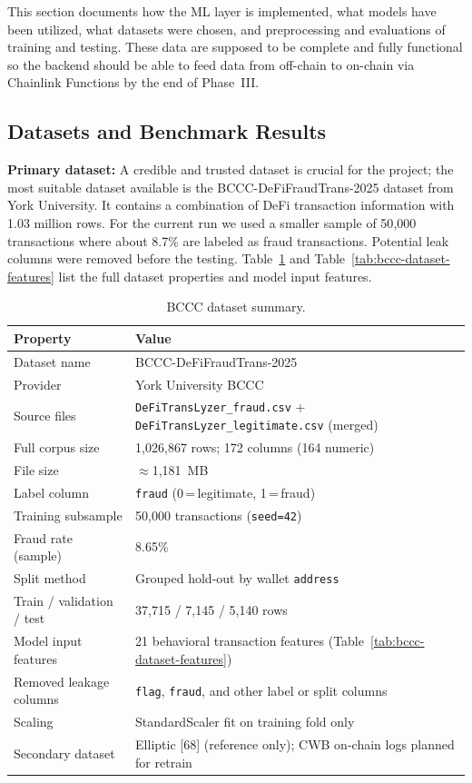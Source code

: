This section documents how the ML layer is implemented, what models have been utilized, what datasets were chosen, and preprocessing and evaluations of training and testing. These data are supposed to be complete and fully functional so the backend should be able to feed data from off-chain to on-chain via Chainlink Functions by the end of Phase~III.

\subsection{Datasets and Benchmark Results}
\label{sec:ml-workload}
\label{sec:ml-explainability}
\label{sec:ml-evaluation}

\textbf{Primary dataset:} A credible and trusted dataset is crucial for the project; the most suitable dataset available is the BCCC-DeFiFraudTrans-2025 dataset from York University. It contains a combination of DeFi transaction information with 1.03 million rows. For the current run we used a smaller sample of 50{,}000 transactions where about 8.7\% are labeled as fraud transactions. Potential leak columns were removed before the testing. Table~\ref{tab:bccc-dataset-summary} and Table~\ref{tab:bccc-dataset-features} list the full dataset properties and model input features.

\begin{table}[H]
\centering
\caption[BCCC dataset summary]{BCCC dataset summary.}
\label{tab:bccc-dataset-summary}
\small
\begin{tabular}{@{}p{3.6cm}p{10.2cm}@{}}
\toprule
\tableheadcolor
\textbf{Property} & \textbf{Value} \\
\midrule
Dataset name & BCCC-DeFiFraudTrans-2025 \\
Provider & York University BCCC \\
Source files & \texttt{DeFiTransLyzer\_fraud.csv} + \texttt{DeFiTransLyzer\_legitimate.csv} (merged) \\
Full corpus size & 1{,}026{,}867 rows; 172 columns (164 numeric) \\
File size & ${\approx}$1{,}181~MB \\
Label column & \texttt{fraud} (0\,=\,legitimate, 1\,=\,fraud) \\
Training subsample & 50{,}000 transactions (\texttt{seed=42}) \\
Fraud rate (sample) & 8.65\% \\
Split method & Grouped hold-out by wallet \texttt{address} \\
Train / validation / test & 37{,}715 / 7{,}145 / 5{,}140 rows \\
Model input features & 21 behavioral transaction features (Table~\ref{tab:bccc-dataset-features}) \\
Removed leakage columns & \texttt{flag}, \texttt{fraud}, and other label or split columns \\
Scaling & StandardScaler fit on training fold only \\
Secondary dataset & Elliptic [68] (reference only); CWB on-chain logs planned for retrain \\
\bottomrule
\end{tabular}
\end{table}

